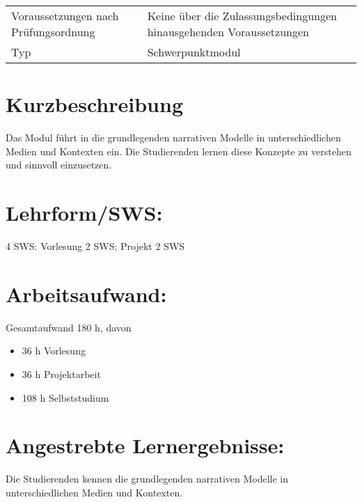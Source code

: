 \begin{longtable}[]{@{}ll@{}}
\begin{minipage}[t]{0.12\columnwidth}
Voraussetzungen nach Prüfungsordnung\strut
\end{minipage} & \begin{minipage}[t]{0.12\columnwidth}\raggedright\strut
Keine über die Zulassungsbedingungen hinausgehenden
Voraussetzungen\strut
\end{minipage}\tabularnewline
\begin{minipage}[t]{0.12\columnwidth}\raggedright\strut
Typ\strut
\end{minipage} & \begin{minipage}[t]{0.12\columnwidth}\raggedright\strut
Schwerpunktmodul\strut
\end{minipage}\tabularnewline
\bottomrule
\end{longtable}

\section*{Kurzbeschreibung}\label{kurzbeschreibung-8}

Das Modul führt in die grundlegenden narrativen Modelle in
unterschiedlichen Medien und Kontexten ein. Die Studierenden lernen
diese Konzepte zu verstehen und sinnvoll einzusetzen.

\section*{Lehrform/SWS:}\label{lehrformsws-17}

4 SWS: Vorlesung 2 SWS; Projekt 2 SWS

\section*{Arbeitsaufwand:}\label{arbeitsaufwand-23}

Gesamtaufwand 180 h, davon

\begin{itemize}
\item
  36 h Vorlesung
\item
  36 h Projektarbeit
\item
  108 h Selbststudium
\end{itemize}

\section*{Angestrebte
Lernergebnisse:}\label{angestrebte-lernergebnisse-17}

Die Studierenden kennen die grundlegenden narrativen Modelle in
unterschiedlichen Medien und Kontexten.

